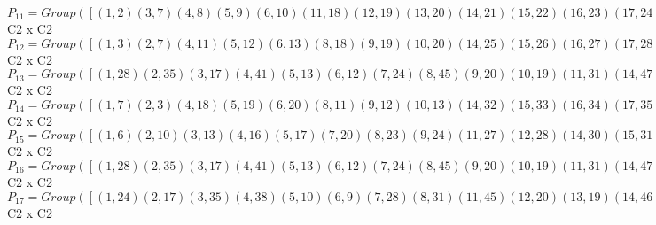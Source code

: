 \documentclass[varwidth=\maxdimen,border=10]{standalone}
\begin{document}
\begin{tabular}
$P_{11} = Group( [ ( 1, 2)( 3, 7)( 4, 8)( 5, 9)( 6,10)(11,18)(12,19)(13,20)(14,21)(15,22)(16,23)(17,24)(25,32)(26,33)(27,34)(28,35)(29,36)(30,37)(31,38)(39,43)(40,44)(41,45)(42,46)(47,48), ( 1,17)( 2,24)( 3,28)( 4,31)( 5, 6)( 7,35)( 8,38)( 9,10)(11,41)(12,13)(14,42)(15,16)(18,45)(19,20)(21,46)(22,23)(25,47)(26,27)(29,30)(32,48)(33,34)(36,37)(39,40)(43,44) ] )\cong$ C2 x C2\ \\
$P_{12} = Group( [ ( 1, 3)( 2, 7)( 4,11)( 5,12)( 6,13)( 8,18)( 9,19)(10,20)(14,25)(15,26)(16,27)(17,28)(21,32)(22,33)(23,34)(24,35)(29,39)(30,40)(31,41)(36,43)(37,44)(38,45)(42,47)(46,48), ( 1,10)( 2, 6)( 3,20)( 4,23)( 5,24)( 7,13)( 8,16)( 9,17)(11,34)(12,35)(14,37)(15,38)(18,27)(19,28)(21,30)(22,31)(25,44)(26,45)(29,46)(32,40)(33,41)(36,42)(39,48)(43,47) ] )\cong$ C2 x C2\ \\
$P_{13} = Group( [ ( 1,28)( 2,35)( 3,17)( 4,41)( 5,13)( 6,12)( 7,24)( 8,45)( 9,20)(10,19)(11,31)(14,47)(15,27)(16,26)(18,38)(21,48)(22,34)(23,33)(25,42)(29,40)(30,39)(32,46)(36,44)(37,43), ( 1, 2)( 3, 7)( 4, 8)( 5, 9)( 6,10)(11,18)(12,19)(13,20)(14,21)(15,22)(16,23)(17,24)(25,32)(26,33)(27,34)(28,35)(29,36)(30,37)(31,38)(39,43)(40,44)(41,45)(42,46)(47,48) ] )\cong$ C2 x C2\ \\
$P_{14} = Group( [ ( 1, 7)( 2, 3)( 4,18)( 5,19)( 6,20)( 8,11)( 9,12)(10,13)(14,32)(15,33)(16,34)(17,35)(21,25)(22,26)(23,27)(24,28)(29,43)(30,44)(31,45)(36,39)(37,40)(38,41)(42,48)(46,47), ( 1,17)( 2,24)( 3,28)( 4,31)( 5, 6)( 7,35)( 8,38)( 9,10)(11,41)(12,13)(14,42)(15,16)(18,45)(19,20)(21,46)(22,23)(25,47)(26,27)(29,30)(32,48)(33,34)(36,37)(39,40)(43,44) ] )\cong$ C2 x C2\ \\
$P_{15} = Group( [ ( 1, 6)( 2,10)( 3,13)( 4,16)( 5,17)( 7,20)( 8,23)( 9,24)(11,27)(12,28)(14,30)(15,31)(18,34)(19,35)(21,37)(22,38)(25,40)(26,41)(29,42)(32,44)(33,45)(36,46)(39,47)(43,48), ( 1,17)( 2,24)( 3,28)( 4,31)( 5, 6)( 7,35)( 8,38)( 9,10)(11,41)(12,13)(14,42)(15,16)(18,45)(19,20)(21,46)(22,23)(25,47)(26,27)(29,30)(32,48)(33,34)(36,37)(39,40)(43,44) ] )\cong$ C2 x C2\ \\
$P_{16} = Group( [ ( 1,28)( 2,35)( 3,17)( 4,41)( 5,13)( 6,12)( 7,24)( 8,45)( 9,20)(10,19)(11,31)(14,47)(15,27)(16,26)(18,38)(21,48)(22,34)(23,33)(25,42)(29,40)(30,39)(32,46)(36,44)(37,43), ( 1, 6)( 2,10)( 3,13)( 4,16)( 5,17)( 7,20)( 8,23)( 9,24)(11,27)(12,28)(14,30)(15,31)(18,34)(19,35)(21,37)(22,38)(25,40)(26,41)(29,42)(32,44)(33,45)(36,46)(39,47)(43,48) ] )\cong$ C2 x C2\ \\
$P_{17} = Group( [ ( 1,24)( 2,17)( 3,35)( 4,38)( 5,10)( 6, 9)( 7,28)( 8,31)(11,45)(12,20)(13,19)(14,46)(15,23)(16,22)(18,41)(21,42)(25,48)(26,34)(27,33)(29,37)(30,36)(32,47)(39,44)(40,43), ( 1, 5)( 2, 9)( 3,12)( 4,15)( 6,17)( 7,19)( 8,22)(10,24)(11,26)(13,28)(14,29)(16,31)(18,33)(20,35)(21,36)(23,38)(25,39)(27,41)(30,42)(32,43)(34,45)(37,46)(40,47)(44,48) ] )\cong$ C2 x C2\ \\

\end{tabular}
\end{document}

